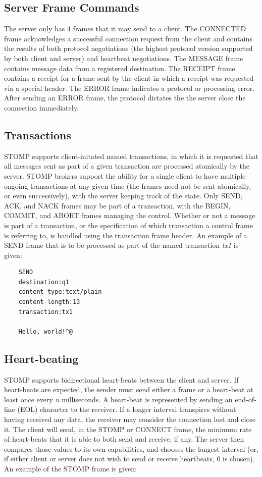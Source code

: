 \documentclass[conference, letterpaper]{IEEEtran}
\begin{document}
\subsection{Server Frame Commands}

The server only has 4 frames that it may send to a client. The CONNECTED frame acknowledges a successful connection request from the client and contains the results of both protocol negotiations (the highest protocol version supported by both client and server) and heartbeat negotiations. The MESSAGE frame contains message data from a registered destination. The RECEIPT frame contains a receipt for a frame sent by the client in which a receipt was requested via a special header. The ERROR frame indicates a protocol or processing error. After sending an ERROR frame, the protocol dictates the the server close the connection immediately.

\subsection{Transactions}
STOMP supports client-initated named transactions, in which it is requested that all messages sent as part of a given transaction are processed atomically by the server. STOMP brokers support the ability for a single client to have multiple ongoing transactions at any given time (the frames need not be sent atomically, or even successively), with the server keeping track of the state. Only SEND, ACK, and NACK frames may be part of a transaction, with the BEGIN, COMMIT, and ABORT frames managing the control. Whether or not a message is part of a transaction, or the specification of which transaction a control frame is referring to, is handled using the transaction frame header. An example of a SEND frame that is to be processed as part of the named transaction \textit{tx1} is given:

\begin{verbatim}
    SEND
    destination:q1
    content-type:text/plain
    content-length:13
    transaction:tx1

    Hello, world!^@
\end{verbatim}

\subsection{Heart-beating}
STOMP supports bidirectional heart-beats between the client and server. If heart-beats are expected, the sender must send either a frame or a heart-beat at least once every \textit{n} milliseconds. A heart-beat is represented by sending an end-of-line (EOL) character to the receiver. If a longer interval transpires without having received any data, the receiver may consider the connection lost and close it. The client will send, in the STOMP or CONNECT frame, the minimum rate of heart-beats that it is able to both send and receive, if any. The server then compares those values to its own capabilities, and chooses the longest interval (or, if either client or server does not wish to send or receive heartbeats, 0 is chosen). An example of the STOMP frame is given:
\end{document}
